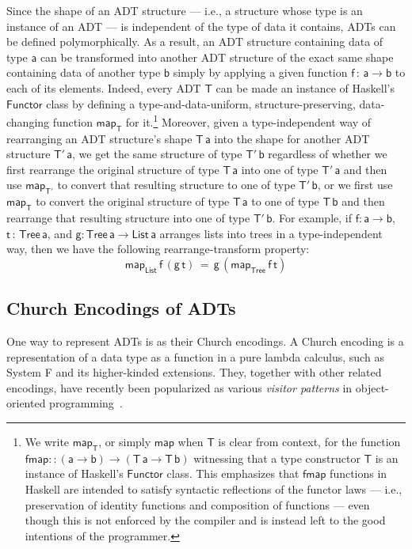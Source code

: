 \documentclass[submission,copyright,creativecommons]{eptcs}
\begin{document}
Since the shape of an ADT structure --- i.e., a structure whose type
is an instance of an ADT --- is independent of the type of data it
contains, ADTs can be defined polymorphically. As a result, an ADT
structure containing data of type $\mathsf{a}$ can be transformed into
another ADT structure of the exact same shape containing data of
another type $\mathsf{b}$ simply by applying a given function
$\mathsf{f \,:\,a \to b}$ to each of its elements. Indeed, every ADT
$\mathsf{T}$ can be made an instance of Haskell's $\mathsf{Functor}$
class by defining a type-and-data-uniform, structure-preserving,
data-changing function $\mathsf{map_T}$ for it.\footnote{We write
  $\mathsf{map_T}$, or simply $\mathsf{map}$ when $\mathsf{T}$ is
  clear from context, for the function $\mathsf{fmap :: (a \to b) \to
    (T\,a \to T\,b)}$ witnessing that a type constructor $\mathsf{T}$
  is an instance of Haskell's $\mathsf{Functor}$ class. This
  emphasizes that $\mathsf{fmap}$ functions in Haskell are intended to
  satisfy syntactic reflections of the functor laws ---
  i.e., preservation of identity functions and composition of
  functions --- even though this is not enforced by the compiler and
  is instead left to the good intentions of the programmer.}
Moreover, given a type-independent way of rearranging an ADT
structure's shape $\mathsf{T\,a}$ into the shape for another ADT
structure $\mathsf{T'\,a}$, we get the same structure of type
$\mathsf{T'\,b}$ regardless of whether we first rearrange the original
structure of type $\mathsf{T\,a}$ into one of type $\mathsf{T'\,a}$
and then use $\mathsf{map_{T'}}$ to convert that resulting structure
to one of type $\mathsf{T'\,b}$, or we first use $\mathsf{map_T}$ to
convert the original structure of type $\mathsf{T\,a}$ to one of type
$\mathsf{T\,b}$ and then rearrange that resulting structure into one
of type $\mathsf{T'\,b}$. For example, if $\mathsf{f : a \to b}$,
$\mathsf{t \,:\,Tree\,a}$, and $\mathsf{g : Tree\,a\to List\,a}$
arranges lists into trees in a type-independent way, then we have the
following rearrange-transform property:
\[\mathsf{map_{List}\,f\,(g \, t) \,=\, g\,(map_{Tree}\,f\,t)}\]

\subsection{Church Encodings of ADTs}

One way to represent ADTs is as their Church encodings. A Church
encoding is a representation of a data type as a function in a pure
lambda calculus, such as System F and its higher-kinded
extensions. They, together with other related encodings, have recently
been popularized as various {\em visitor patterns} in object-oriented
programming~\cite{gon21,owg08}.
\end{document}
